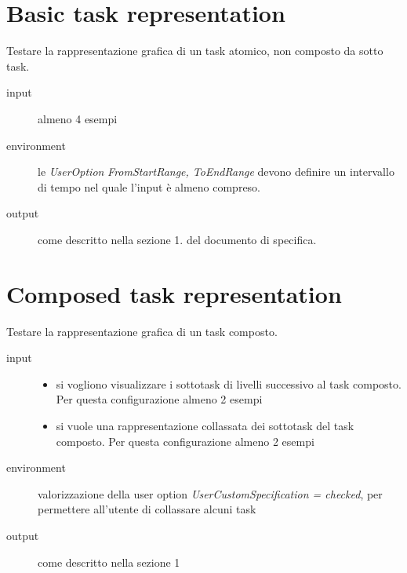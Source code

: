 \section{Basic task representation}
\label{sec:ganttBasicTaskRepresentation}
Testare la rappresentazione grafica di un task atomico, non composto da sotto
task.
\begin{description}
\item[input] almeno 4 esempi
\item[environment] le \emph{UserOption} \emph{FromStartRange, ToEndRange}
devono definire un intervallo di tempo nel quale l'input \`e almeno compreso.
\item[output] come descritto nella sezione 1. del
documento di specifica.
\end{description}

\section{Composed task representation}
\label{sec:ganttComposedTaskRepresentation}
Testare la rappresentazione grafica di un task composto.
\begin{description}
\item[input] 
\quad
\begin{itemize}
  \item si vogliono visualizzare i sottotask di livelli successivo al task
  composto. Per questa configurazione almeno 2 esempi
  \item si vuole una rappresentazione collassata dei sottotask del task
  composto. Per questa configurazione almeno 2 esempi
\end{itemize}
\item[environment] valorizzazione della user option
\emph{UserCustomSpecification = checked}, per permettere all'utente di
collassare alcuni task
\item[output] come descritto nella sezione 1
\end{description}

